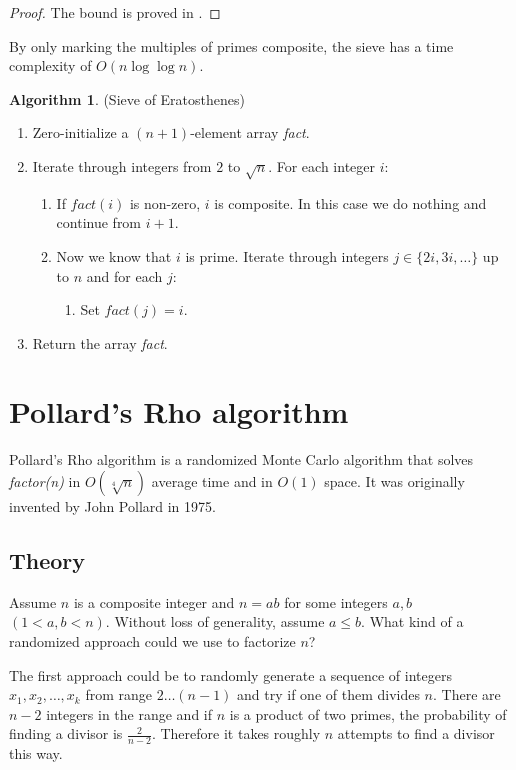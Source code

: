 \documentclass[12pt] {article}
\theoremstyle{plain}
\theoremstyle{definition}
\newtheorem{algo}[thm]{Algorithm}
\begin{document}
\begin{proof}
The bound is proved in \cite{primereciprocal}.
\end{proof}

By only marking the multiples of primes composite, the sieve has a time complexity of $O(n \log{\log{n}})$.

\begin{algo} (Sieve of Eratosthenes)
\begin{enumerate}
\item Zero-initialize a $(n+1)$-element array \textit{fact}.
\item Iterate through integers from $2$ to $\sqrt{n}$. For each integer $i$:
\begin{enumerate}
	\item If $fact(i)$ is non-zero, $i$ is composite. In this case we do nothing and continue from $i+1$.
	\item Now we know that $i$ is prime. Iterate through integers $j \in \{2i, 3i, \dots\}$ up to $n$ and for each $j$:
	\begin{enumerate}
		\item Set $fact(j) = i$.
	\end{enumerate}
\end{enumerate}
\item Return the array \textit{fact}.
\end{enumerate}
\end{algo}

\section {Pollard's Rho algorithm}

Pollard's Rho algorithm is a randomized Monte Carlo algorithm that solves \textit{factor(n)} in $O(\sqrt[4]{n})$ average time and in $O(1)$ space. It was originally invented by John Pollard in 1975\cite{pollard}.

\subsection {Theory}

Assume $n$ is a composite integer and $n = ab$ for some integers $a, b$ $(1 < a, b < n)$. Without loss of generality, assume $a \leq b$. What kind of a randomized approach could we use to factorize $n$?

The first approach could be to randomly generate a sequence of integers $x_1, x_2, \dots, x_k$ from range $2 \dots (n-1)$ and try if one of them divides $n$. There are $n-2$ integers in the range and if $n$ is a product of two primes, the probability of finding a divisor is $\frac{2}{n-2}$. Therefore it takes roughly $n$ attempts to find a divisor this way.
\end{document}
